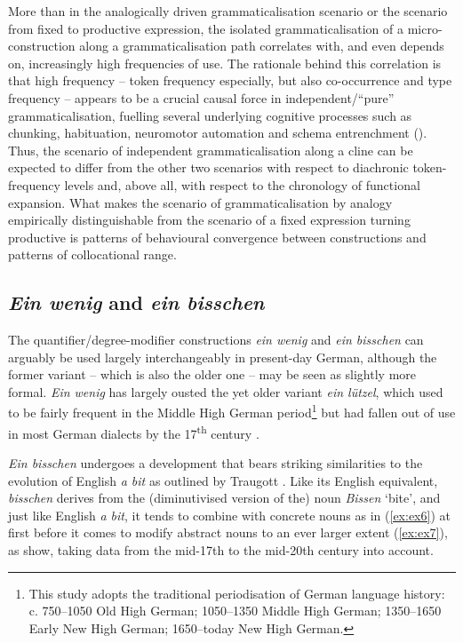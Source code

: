 \documentclass[output=paper]{langsci/langscibook}
\begin{document}
\begin{sloppypar}
More than in the analogically driven grammaticalisation scenario or the scenario from fixed to productive expression, the isolated grammaticalisation of a micro-construction along a grammaticalisation path correlates with, and even depends on, increasingly high frequencies of use. The rationale behind this correlation is that high frequency – token frequency especially, but also co-occurrence and type frequency – appears to be a crucial causal force in independent/“pure” grammaticalisation, fuelling several underlying cognitive processes such as chunking, habituation, neuromotor automation and schema entrenchment (\citealt{BybeeMechanismsChangeGrammaticization2003, KrugFrequencyDeterminantGrammatical2003, DisselHilpert2016, NeelsRefiningfrequencyeffectexplanations2020}). Thus, the scenario of independent grammaticalisation along a cline can be expected to differ from the other two scenarios with respect to diachronic token-frequency levels and, above all, with respect to the chronology of functional expansion. What makes the scenario of grammaticalisation by analogy empirically distinguishable from the scenario of a fixed expression turning productive is patterns of behavioural convergence between constructions and patterns of collocational range. 
\end{sloppypar}

\subsection{\textit{Ein wenig} and \textit{ein bisschen}} \label{sec3-3}

The quantifier\slash degree\hyp{}modifier constructions \textit{ein wenig} and \textit{ein bisschen} can arguably be used largely interchangeably in present-day German, although the former variant – which is also the older one – may be seen as slightly more formal.\textit{ Ein wenig} has largely ousted the yet older variant \textit{ein lützel}, which used to be fairly frequent in the Middle High German period\footnote{This study adopts the traditional periodisation of German language history: c. 750–1050 Old High German; 1050–1350 Middle High German; 1350–1650 Early New High German; 1650–today New High German.}  but had fallen out of use in most German dialects by the 17\textsuperscript{th} century {\citep[see][143]{NeelsReductionexpansionbit2018}}.

\textit{Ein bisschen} undergoes a development that bears striking similarities to the evolution of English \textit{a bit} as outlined by Traugott \citep[][]{Traugottconceptsconstructionalmismatch2007, TraugottGrammaticalizationConstructionsIncremental2008, TraugottGrammaticalizationNPNP2008}. Like its English equivalent, \textit{bisschen} derives from the (diminutivised version of the) noun \textit{Bissen} ‘bite’, and just like English \textit{a bit}, it tends to combine with concrete nouns as in (\ref{ex:ex6}) at first before it comes to modify abstract nouns to an ever larger extent (\ref{ex:ex7}), as {\citet[][]{NeelsReductionexpansionbit2018}} show, taking data from the mid-17th to the mid-20th century into account. 
\end{document}
